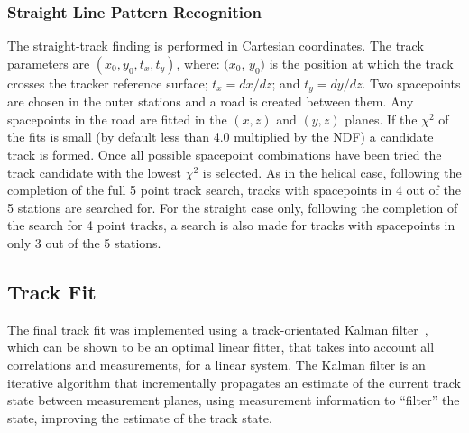 
    \subsubsection{Straight Line Pattern Recognition}
    \label{subsubsec:StraightLinePatternRecognition}


    The straight-track finding is performed in Cartesian coordinates. The track parameters are $(x_0, y_0, t_x, t_y)$, where: $(x_0$, $y_0)$ is the position at which the track crosses the tracker reference surface; $t_x = dx/dz$; and $t_y = dy/dz$. Two spacepoints are chosen in the outer stations and a road is created between them. Any spacepoints in the road are fitted in the $(x,z)$ and $(y,z)$ planes. If the $\chi^2$ of the fits is small (by default less than 4.0 multiplied by the NDF) a candidate track is formed. Once all possible spacepoint combinations have been tried the track candidate with the lowest $\chi^2$ is selected. As in the helical case, following the completion of the full 5 point track search, tracks with spacepoints in 4 out of the 5 stations are searched for. For the straight case only, following the completion of the search for 4 point tracks, a search is also made for tracks with spacepoints in only 3 out of the 5 stations. 

   \subsection{Track Fit}
   \label{subsec:FinalTrackFit}
   The final track fit was implemented using a track-orientated Kalman filter~\cite{Fruhwirth,Billoir}, which can be shown to be an optimal linear fitter, that takes into account all correlations and measurements, for a linear system. The Kalman filter is an iterative algorithm that incrementally propagates an estimate of the current track state between measurement planes, using measurement information to ``filter'' the state, improving the estimate of the track state.
   
